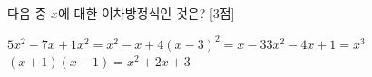 다음 중 $x$에 대한 이차방정식인 것은? \mbox{[3점]}
\begin{choicesii}{$5x^2-7x+1$}{$x^2=x^2-x+4$}{$(x-3)^2=x-3$}{$3x^2-4x+1=x^3$}{$(x+1)(x-1)=x^2+2x+3$}\end{choicesii}
